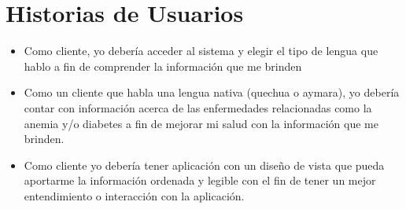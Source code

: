 \chapter{Historias de Usuarios}
\begin{itemize}

\item Como cliente, yo debería acceder al sistema y elegir el tipo de lengua que hablo a fin de comprender la información que me brinden
\item Como un cliente que habla una lengua nativa (quechua o aymara), yo debería contar con información acerca de las enfermedades relacionadas como la anemia y/o diabetes a fin de mejorar mi salud con la información que me brinden. 
\item Como cliente yo debería tener aplicación con un diseño de vista que pueda aportarme la información ordenada y legible con el fin de tener un mejor entendimiento o interacción con la aplicación.
\end{itemize}